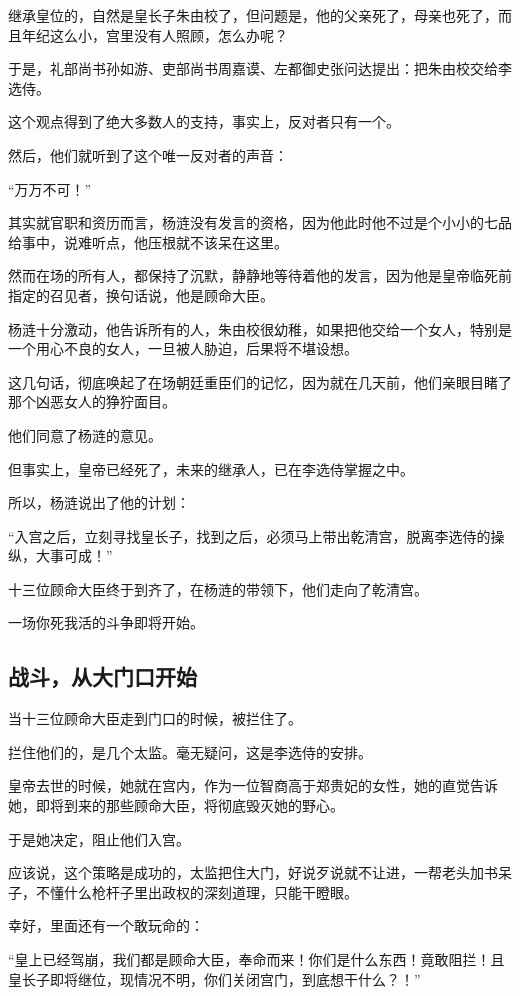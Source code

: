 \begin{multicols}{\theparacolNo}
继承皇位的，自然是皇长子朱由校了，但问题是，他的父亲死了，母亲也死了，而且年纪这么小，宫里没有人照顾，怎么办呢？

于是，礼部尚书孙如游、吏部尚书周嘉谟、左都御史张问达提出：把朱由校交给李选侍。

这个观点得到了绝大多数人的支持，事实上，反对者只有一个。

然后，他们就听到了这个唯一反对者的声音：

“万万不可！”

其实就官职和资历而言，杨涟没有发言的资格，因为他此时他不过是个小小的七品给事中，说难听点，他压根就不该呆在这里。

然而在场的所有人，都保持了沉默，静静地等待着他的发言，因为他是皇帝临死前指定的召见者，换句话说，他是顾命大臣。

杨涟十分激动，他告诉所有的人，朱由校很幼稚，如果把他交给一个女人，特别是一个用心不良的女人，一旦被人胁迫，后果将不堪设想。

这几句话，彻底唤起了在场朝廷重臣们的记忆，因为就在几天前，他们亲眼目睹了那个凶恶女人的狰狞面目。

他们同意了杨涟的意见。

但事实上，皇帝已经死了，未来的继承人，已在李选侍掌握之中。

所以，杨涟说出了他的计划：

“入宫之后，立刻寻找皇长子，找到之后，必须马上带出乾清宫，脱离李选侍的操纵，大事可成！”

十三位顾命大臣终于到齐了，在杨涟的带领下，他们走向了乾清宫。

一场你死我活的斗争即将开始。

\subsection{战斗，从大门口开始}
当十三位顾命大臣走到门口的时候，被拦住了。

拦住他们的，是几个太监。毫无疑问，这是李选侍的安排。

皇帝去世的时候，她就在宫内，作为一位智商高于郑贵妃的女性，她的直觉告诉她，即将到来的那些顾命大臣，将彻底毁灭她的野心。

于是她决定，阻止他们入宫。

应该说，这个策略是成功的，太监把住大门，好说歹说就不让进，一帮老头加书呆子，不懂什么枪杆子里出政权的深刻道理，只能干瞪眼。

幸好，里面还有一个敢玩命的：

“皇上已经驾崩，我们都是顾命大臣，奉命而来！你们是什么东西！竟敢阻拦！且皇长子即将继位，现情况不明，你们关闭宫门，到底想干什么？！”


\end{multicols}
